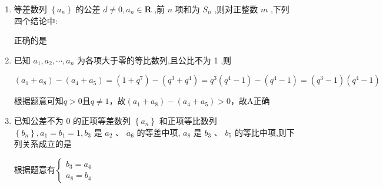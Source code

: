 \begin{enumerate}
\begin{jieda}
        因为$a_1 > 0$，所以必有$a_2 > d$，故C正确.
    \end{jieda}
    \item 等差数列 $\left\{  {a}_{n}\right\}$ 的公差 $d \neq  0,{a}_{n} \in  \mathbf{R}$ ,前 $n$ 项和为 ${S}_{n}$ ,则对正整数 $m$ ,下列四个结论中:
    正确的是
    \item 已知 ${a}_{1},{a}_{2},\cdots ,{a}_{n}$ 为各项大于零的等比数列,且公比不为 1 ,则
    \begin{jieda}
        $({a}_{1} + {a}_{8})-({a}_{4} + {a}_{5}) = (1+q^7)-(q^3+q^4) = q^3(q^4-1)-(q^4-1) = (q^3-1)(q^4-1)$
        
        根据题意可知$q > 0$且$q \neq 1$，故$({a}_{1} + {a}_{8})-({a}_{4} + {a}_{5}) > 0$，故A正确
    \end{jieda}
    \item 已知公差不为 0 的正项等差数列 $\left\{  {a}_{n}\right\}$ 和正项等比数列 $\left\{  {b}_{n}\right\}  ,{a}_{1} = {b}_{1} = 1,{b}_{3}$ 是 ${a}_{2}\text{ 、 }{a}_{6}$ 的等差中项, ${a}_{8}$ 是 ${b}_{3}$ 、 ${b}_{5}$ 的等比中项,则下列关系成立的是
    \begin{jieda}
        根据题意有$\left\{\begin{array}{l}
             b_3 = a_4 \\
             a_8 = b_4
        \end{array}\right.$
    

\end{jieda}
\end{enumerate}
